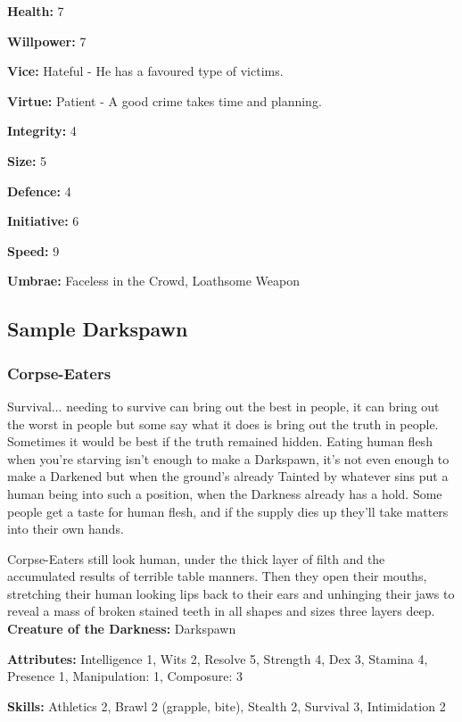 \noindent \textbf{Health:} 7

\noindent \textbf{Willpower:} 7

\noindent \textbf{Vice:} Hateful - He has a favoured type of victims. 

\noindent \textbf{Virtue:} Patient - A good crime takes time and planning. 

\noindent \textbf{Integrity:} 4

\noindent \textbf{Size:} 5

\noindent \textbf{Defence:} 4

\noindent \textbf{Initiative:} 6

\noindent \textbf{Speed:} 9

\noindent \textbf{Umbrae:} Faceless in the Crowd, Loathsome Weapon


\subsection*{Sample Darkspawn}

\subsubsection*{Corpse-Eaters}

Survival... needing to survive can bring out the best in people, it can bring out the worst in people but some say what it does is bring out the truth in people. Sometimes it would be best if the truth remained hidden. Eating human flesh when you're starving isn't enough to make a Darkspawn, it's not even enough to make a Darkened but when the ground's already Tainted by whatever sins put a human being into such a position, when the Darkness already has a hold. Some people get a taste for human flesh, and if the supply dies up they'll take matters into their own hands.

Corpse-Eaters still look human, under the thick layer of filth and the accumulated results of terrible table manners. Then they open their mouths, stretching their human looking lips back to their ears and unhinging their jaws to reveal a mass of broken stained teeth in all shapes and sizes three layers deep.\\

\noindent \textbf{Creature of the Darkness:} Darkspawn

\noindent \textbf{Attributes:} Intelligence 1, Wits 2, Resolve 5, Strength 4, Dex 3, Stamina 4, Presence 1, Manipulation: 1, Composure: 3

\noindent \textbf{Skills:} Athletics 2, Brawl 2 (grapple, bite), Stealth 2, Survival 3, Intimidation 2

